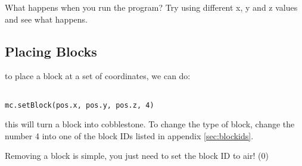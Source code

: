 		What happens when you run the program? Try using different x, y and z values and see what happens.
		
	\pagebreak[1]	
	\subsection*{Placing Blocks}
		
		to place a block at a set of coordinates, we can do:
		
		\begin{lstlisting}[style=Python, firstnumber=8]

mc.setBlock(pos.x, pos.y, pos.z, 4)
		\end{lstlisting}
		
		this will turn a block into cobblestone. To change the type of block, change the number 4 into one of the block IDs listed in appendix \autoref{sec:blockids}. 
		
		Removing a block is simple, you just need to set the block ID to air! (0)
		
		